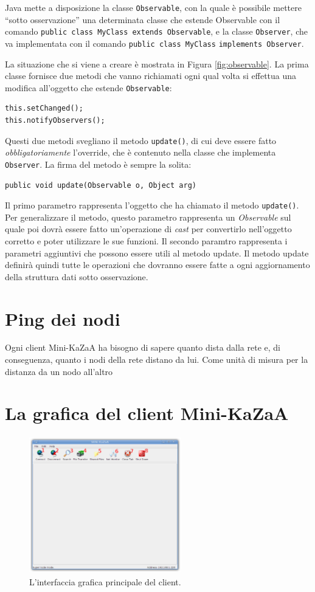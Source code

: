 Java mette a disposizione la classe \verb|Observable|,%
con la quale è possibile mettere ``sotto osservazione'' una determinata classe che estende Observable con il comando \verb|public class MyClass extends Observable|, e la classe \verb|Observer|, che va implementata con il comando \verb|public class MyClass| \verb|implements Observer|.

La situazione che si viene a creare è mostrata in Figura \ref{fig:observable}.
La prima classe fornisce due metodi che vanno richiamati ogni qual volta si effettua una modifica all'oggetto che estende \verb|Observable|:
\begin{lstlisting}
this.setChanged();
this.notifyObservers();
\end{lstlisting}
Questi due metodi svegliano il metodo \verb|update()|, di cui deve essere fatto \emph{obbligatoriamente} l'override, che è contenuto nella classe che implementa \verb|Observer|.
La firma del metodo è sempre la solita:
\begin{lstlisting}
public void update(Observable o, Object arg)
\end{lstlisting}
Il primo parametro rappresenta l'oggetto che ha chiamato il metodo \verb|update()|. Per generalizzare il metodo,
questo parametro rappresenta un \emph{Observable} sul quale poi dovrà essere fatto un'operazione di \emph{cast}
per convertirlo nell'oggetto corretto e poter utilizzare le sue funzioni. Il secondo paramtro rappresenta i parametri aggiuntivi che possono essere utili al metodo update.
Il metodo update definirà quindi tutte le operazioni che dovranno essere fatte a ogni aggiornamento della struttura dati sotto osservazione.

\section{Ping dei nodi}\label{sec:ping}
Ogni client Mini-KaZaA ha bisogno di sapere quanto dista dalla rete e, di conseguenza, quanto i nodi della rete distano da lui.
Come unità di misura per la distanza da un nodo all'altro

\section{La grafica del client Mini-KaZaA}\label{sec:grafica}
\begin{figure}[t]
 \centering
 \includegraphics[width=250px,height=225px,bb=14 14 841 737]{images/mini_kazaa_client.eps}
 \caption{L'interfaccia grafica principale del client.}
 \label{fig:mini_kazaa_client}
\end{figure}


